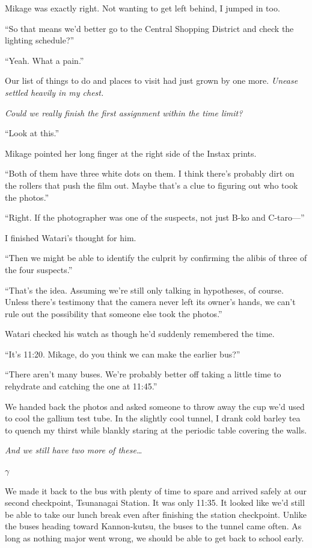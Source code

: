\documentclass[
    a4paper,
    12pt,
    twoside,
    openany,
    UTF8,
    fontset=windows
]{ctexbook}
\begin{document}
Mikage was exactly right. Not wanting to get left behind, I jumped in too.

``So that means we'd better go to the Central Shopping District and check the lighting schedule?''

``Yeah. What a pain.''

Our list of things to do and places to visit had just grown by one more. \textit{Unease settled heavily in my chest.}

\textit{Could we really finish the first assignment within the time limit?}

``Look at this.''

Mikage pointed her long finger at the right side of the Instax prints.

``Both of them have three white dots on them. I think there's probably dirt on the rollers that push the film out. Maybe that's a clue to figuring out who took the photos.''

``Right. If the photographer was one of the suspects, not just B-ko and C-taro---''

I finished Watari's thought for him.

``Then we might be able to identify the culprit by confirming the alibis of three of the four suspects.''

``That's the idea. Assuming we're still only talking in hypotheses, of course. Unless there's testimony that the camera never left its owner's hands, we can't rule out the possibility that someone else took the photos.''

Watari checked his watch as though he'd suddenly remembered the time.

``It's 11:20. Mikage, do you think we can make the earlier bus?''

``There aren't many buses. We're probably better off taking a little time to rehydrate and catching the one at 11:45.''

We handed back the photos and asked someone to throw away the cup we'd used to cool the gallium test tube. In the slightly cool tunnel, I drank cold barley tea to quench my thirst while blankly staring at the periodic table covering the walls.

\textit{And we still have two more of these\dots}

$\gamma$

We made it back to the bus with plenty of time to spare and arrived safely at our second checkpoint, Tsunanagai Station. It was only 11:35. It looked like we'd still be able to take our lunch break even after finishing the station checkpoint. Unlike the buses heading toward Kannon-kutsu, the buses to the tunnel came often. As long as nothing major went wrong, we should be able to get back to school early.
\end{document}
